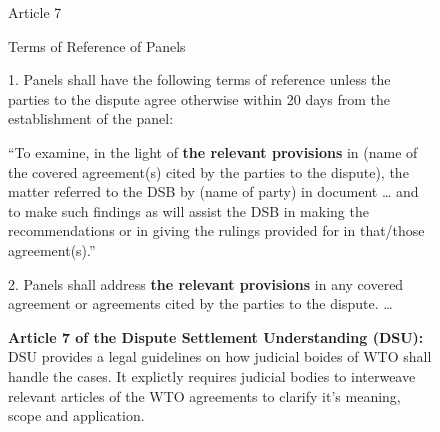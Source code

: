 \begin{figure}
  \begin{displayquote}[][]
    \begin{center}
      Article 7
    \end{center}
    \begin{center}
      Terms of Reference of Panels
    \end{center}
  
    1. Panels shall have the following terms of reference unless the parties to the dispute
    agree otherwise within 20 days from the establishment of the panel:
  
    \begin{displayquote}[][]
  
      ``To examine, in the light of {\bf the relevant provisions} in (name of the covered
      agreement(s) cited by the parties to the dispute), the matter referred to the DSB by
      (name of party) in document … and to make such findings as will assist the DSB in
      making the recommendations or in giving the rulings provided for in that/those
      agreement(s).''
        
    \end{displayquote}
  
    2. Panels shall address {\bf the relevant provisions} in any covered agreement or agreements
    cited by the parties to the dispute. \ldots
  \end{displayquote}
  \caption{\textbf{Article 7 of the Dispute Settlement Understanding (DSU): } 
  DSU provides a legal guidelines on how judicial boides of WTO shall handle the cases.
  It explictly requires judicial bodies to interweave relevant articles of the WTO agreements to clarify
  it's meaning, scope and application.
  } 
  \label{fig:art7dsu}
\end{figure}


